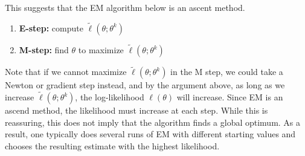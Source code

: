 This suggests that the EM algorithm below is an ascent method.

\begin{enumerate}
\item {\bf E-step:} compute $\tilde{\ell}(\theta ; \theta^k)$
\item {\bf M-step:} find $\theta$ to maximize $\tilde{\ell}(\theta ; \theta^k)$
\end{enumerate} 

Note that if we cannot maximize $\tilde{\ell}(\theta ; \theta^k)$ in the M step, we could take a Newton or gradient step instead, and by the argument above, as long as we increase $\tilde{\ell}(\theta ; \theta^k)$, the log-likelihood $\ell(\theta)$ will increase.  Since EM is an ascend method, the likelihood must increase at each step.  While this is reassuring, this does not imply that the algorithm finds a global optimum. As a result, one typically does several runs of EM with different starting values and chooses the resulting estimate with the highest likelihood.





